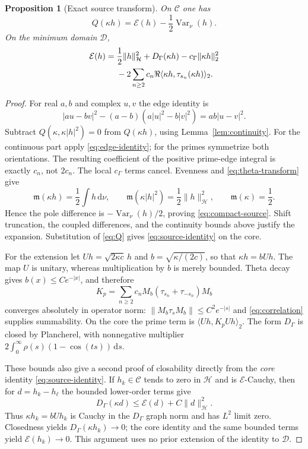 \documentclass[11pt,a4paper]{article}
\newcommand{\HH}{\mathcal H}
\newcommand{\DD}{\mathcal D}
\newcommand{\EE}{\mathcal E}
\newcommand{\CC}{\mathcal C}
\newcommand{\ip}[2]{\langle #1,#2\rangle}
\newcommand{\norm}[1]{\lVert #1\rVert}
\newcommand{\abs}[1]{\lvert #1\rvert}
\newcommand{\dd}{\,\mathrm d}
\newcommand{\Var}{\operatorname{Var}}
\newtheorem{proposition}[theorem]{Proposition}
\theoremstyle{definition}
\theoremstyle{remark}
\numberwithin{equation}{section}
\begin{document}
\begin{proposition}[Exact source transform]\label{prop:source-transform}
On $\CC$ one has
\begin{equation}\label{eq:compact-source}
 Q(\kappa h)=\EE(h)-\frac12\Var_\nu(h).
\end{equation}
On the minimum domain $\DD$,
\begin{align}\label{eq:source-identity}
 \EE(h)={}&\frac12\norm h_{\HH}^2+D_\Gamma(\kappa h)
            -c_\Gamma\norm{\kappa h}_2^2\notag\\
 &-2\sum_{n\ge2}c_n\Re\ip{\kappa h}{\tau_{s_n}(\kappa h)}_2.
\end{align}
\end{proposition}
\begin{proof}
For real $a,b$ and complex $u,v$ the edge identity is
\begin{equation}\label{eq:edge-identity}
 \abs{au-bv}^2-(a-b)(a\abs u^2-b\abs v^2)
       =ab\abs{u-v}^2.
\end{equation}
Subtract $Q(\kappa,\kappa\abs h^2)=0$ from $Q(\kappa h)$, using
Lemma~\ref{lem:continuity}. For the continuous part apply
\eqref{eq:edge-identity}; for the primes symmetrize both orientations.
The resulting coefficient of the positive prime-edge integral is exactly
$c_n$, not $2c_n$. The local $c_\Gamma$ terms cancel. Evenness and
\eqref{eq:theta-transform} give
\[
 \mathfrak m(\kappa h)=\frac12\int h\dd\nu,
 \qquad \mathfrak m(\kappa\abs h^2)=\frac12\norm h_{\HH}^2,
 \qquad \mathfrak m(\kappa)=\frac12.
\]
Hence the pole difference is $-\Var_\nu(h)/2$, proving
\eqref{eq:compact-source}. Shift truncation, the coupled differences, and
the continuity bounds above justify the expansion. Substitution of
\eqref{eq:Q} gives \eqref{eq:source-identity} on the core.

For the extension let $Uh=\sqrt{2\kappa c}\,h$ and
$b=\sqrt{\kappa/(2c)}$, so that $\kappa h=bUh$. The map $U$ is unitary,
whereas multiplication by $b$ is merely bounded. Theta decay gives
$b(x)\le C e^{-\abs{x}}$, and therefore
\begin{equation}\label{eq:Kp}
 K_p=\sum_{n\ge2}c_n M_b(\tau_{s_n}+\tau_{-s_n})M_b
\end{equation}
converges absolutely in operator norm:
$\norm{M_b\tau_sM_b}\le C^2e^{-\abs s}$ and
\eqref{eq:correlation} supplies summability. On the core the prime term is
$\ip{Uh}{K_pUh}_2$. The form $D_\Gamma$ is closed by Plancherel, with
nonnegative multiplier
$2\int_0^\infty\rho(s)(1-\cos(ts))\dd s$.

These bounds also give a second proof of closability directly from the
\emph{core} identity \eqref{eq:source-identity}. If $h_k\in\CC$ tends to
zero in $\HH$ and is $\EE$-Cauchy, then for $d=h_k-h_\ell$ the bounded
lower-order terms give
\[
 D_\Gamma(\kappa d)\le\EE(d)+C\norm d_{\HH}^2.
\]
Thus $\kappa h_k=bUh_k$ is Cauchy in the $D_\Gamma$ graph norm and has
$L^2$ limit zero. Closedness yields $D_\Gamma(\kappa h_k)\to0$; the
core identity and the same bounded terms yield $\EE(h_k)\to0$.
This argument uses no prior extension of the identity to $\DD$.


\end{proof}
\end{document}
